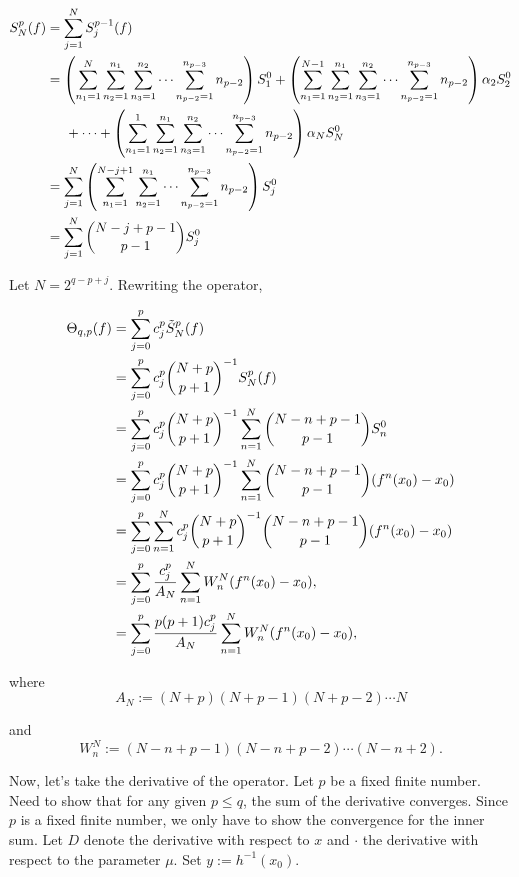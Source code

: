 \documentclass[12pt]{article}
\begin{document}
\begin{equation*}\begin{split}
S_N^p (f) &= \sum_{j=1}^N S_j^{p-1} (f) \\
&= \left( \sum_{n_1=1}^{N} \sum_{n_2=1}^{n_1} \sum_{n_3=1}^{n_2} \cdots \sum_{n_{p-2}=1}^{n_{p-3}} n_{p-2} \right) S_1^0 + \left( \sum_{n_1=1}^{N-1} \sum_{n_2=1}^{n_1} \sum_{n_3=1}^{n_2} \cdots \sum_{n_{p-2}=1}^{n_{p-3}} n_{p-2} \right) \alpha_2 S_2^0 \\& \hspace{0.2in} + \cdots + \left( \sum_{n_1=1}^{1} \sum_{n_2=1}^{n_1} \sum_{n_3=1}^{n_2} \cdots \sum_{n_{p-2}=1}^{n_{p-3}} n_{p-2} \right)\alpha_N S_N^0\\
&= \sum_{j=1}^{N} \left( \sum_{n_1=1}^{N-j+1} \sum_{n_2=1}^{n_1} \cdots \sum_{n_{p-2}=1}^{n_{p-3}} n_{p-2}\right) S_j^0\\
&= \sum_{j=1}^{N} {N-j+p-1 \choose p-1} S_j^0
\end{split}\end{equation*}

Let $N=2^{q-p+j}$. Rewriting the operator,

\begin{equation*}\begin{split}
\Theta_{q,p}(f)
& = \sum_{j=0}^{p} c_j^p \Tilde{S}_{N}^{p}(f) \\
& = \sum_{j=0}^{p} c_j^p {N+p \choose p+1}^{-1} S_{N}^{p}(f) \\
& = \sum_{j=0}^{p} c_j^p {N+p \choose p+1}^{-1} \sum_{n=1}^{N} {N-n+p-1 \choose p-1}S_n^0 \\
& = \sum_{j=0}^{p} c_j^p {N+p \choose p+1}^{-1} \sum_{n=1}^{N} {N-n+p-1 \choose p-1}(f^n(x_0)-x_0) \\
& = \sum_{j=0}^{p} \sum_{n=1}^{N} c_j^p {N+p \choose p+1}^{-1} {N-n+p-1 \choose p-1}(f^n(x_0)-x_0) \\
& = \sum_{j=0}^{p} \frac{c_j^p}{A_N} \sum_{n=1}^{N} W_n^N  (f^n(x_0)-x_0), \\
& = \sum_{j=0}^{p} \frac{p(p+1)c_j^p}{A_N} \sum_{n=1}^{N} W_n^N  (f^n(x_0)-x_0), \\
\end{split}\end{equation*}

where $$A_N := (N+p)(N+p-1)(N+p-2)\cdots N$$ 

and $$W_n^N := (N-n+p-1)(N-n+p-2)\cdots(N-n+2).$$

Now, let's take the derivative of the operator. Let $p$ be a fixed finite number. Need to show that for any given $p \leq q$, the sum of the derivative converges. Since $p$ is a fixed finite number, we only have to show the convergence for the inner sum. Let $D$ denote the derivative with respect to $x$ and $\cdot$ the derivative with respect to the parameter $\mu$. Set $y:=h^{-1}(x_0)$. 
\end{document}
